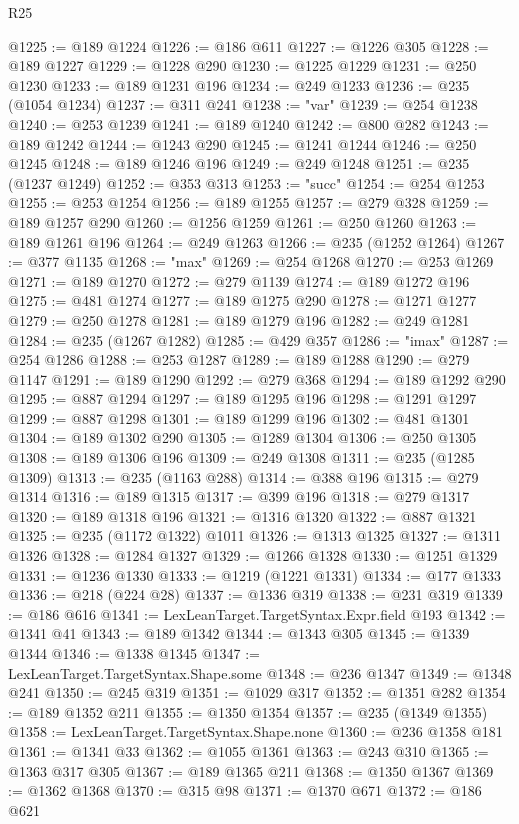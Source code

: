 \begin{lexlean}{R25}
\begin{coremodule}
@1225 := @189 @1224
@1226 := @186 @611
@1227 := @1226 @305
@1228 := @189 @1227
@1229 := @1228 @290
@1230 := @1225 @1229
@1231 := @250 @1230
@1233 := @189 @1231 @196
@1234 := @249 @1233
@1236 := @235 (@1054 @1234)
@1237 := @311 @241
@1238 := "var"
@1239 := @254 @1238
@1240 := @253 @1239
@1241 := @189 @1240
@1242 := @800 @282
@1243 := @189 @1242
@1244 := @1243 @290
@1245 := @1241 @1244
@1246 := @250 @1245
@1248 := @189 @1246 @196
@1249 := @249 @1248
@1251 := @235 (@1237 @1249)
@1252 := @353 @313
@1253 := "succ"
@1254 := @254 @1253
@1255 := @253 @1254
@1256 := @189 @1255
@1257 := @279 @328
@1259 := @189 @1257 @290
@1260 := @1256 @1259
@1261 := @250 @1260
@1263 := @189 @1261 @196
@1264 := @249 @1263
@1266 := @235 (@1252 @1264)
@1267 := @377 @1135
@1268 := "max"
@1269 := @254 @1268
@1270 := @253 @1269
@1271 := @189 @1270
@1272 := @279 @1139
@1274 := @189 @1272 @196
@1275 := @481 @1274
@1277 := @189 @1275 @290
@1278 := @1271 @1277
@1279 := @250 @1278
@1281 := @189 @1279 @196
@1282 := @249 @1281
@1284 := @235 (@1267 @1282)
@1285 := @429 @357
@1286 := "imax"
@1287 := @254 @1286
@1288 := @253 @1287
@1289 := @189 @1288
@1290 := @279 @1147
@1291 := @189 @1290
@1292 := @279 @368
@1294 := @189 @1292 @290
@1295 := @887 @1294
@1297 := @189 @1295 @196
@1298 := @1291 @1297
@1299 := @887 @1298
@1301 := @189 @1299 @196
@1302 := @481 @1301
@1304 := @189 @1302 @290
@1305 := @1289 @1304
@1306 := @250 @1305
@1308 := @189 @1306 @196
@1309 := @249 @1308
@1311 := @235 (@1285 @1309)
@1313 := @235 (@1163 @288)
@1314 := @388 @196
@1315 := @279 @1314
@1316 := @189 @1315
@1317 := @399 @196
@1318 := @279 @1317
@1320 := @189 @1318 @196
@1321 := @1316 @1320
@1322 := @887 @1321
@1325 := @235 (@1172 @1322) @1011
@1326 := @1313 @1325
@1327 := @1311 @1326
@1328 := @1284 @1327
@1329 := @1266 @1328
@1330 := @1251 @1329
@1331 := @1236 @1330
@1333 := @1219 (@1221 @1331)
@1334 := @177 @1333
@1336 := @218 (@224 @28)
@1337 := @1336 @319
@1338 := @231 @319
@1339 := @186 @616
@1341 := LexLeanTarget.TargetSyntax.Expr.field @193
@1342 := @1341 @41
@1343 := @189 @1342
@1344 := @1343 @305
@1345 := @1339 @1344
@1346 := @1338 @1345
@1347 := LexLeanTarget.TargetSyntax.Shape.some
@1348 := @236 @1347
@1349 := @1348 @241
@1350 := @245 @319
@1351 := @1029 @317
@1352 := @1351 @282
@1354 := @189 @1352 @211
@1355 := @1350 @1354
@1357 := @235 (@1349 @1355)
@1358 := LexLeanTarget.TargetSyntax.Shape.none
@1360 := @236 @1358 @181
@1361 := @1341 @33
@1362 := @1055 @1361
@1363 := @243 @310
@1365 := @1363 @317 @305
@1367 := @189 @1365 @211
@1368 := @1350 @1367
@1369 := @1362 @1368
@1370 := @315 @98
@1371 := @1370 @671
@1372 := @186 @621

\end{coremodule}
\end{lexlean}
